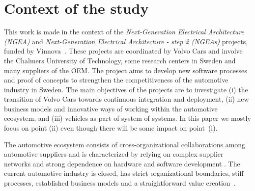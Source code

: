 \section{Context of the study}\label{sec:context}


This work is made in the context of the {\em Next-Generation Electrical Architecture (NGEA)} and {\em Next-Generation Electrical Architecture - step 2 (NGEAs)} projects, funded by Vinnova~\cite{Vinnova}. 
These projects are coordinated by Volvo Cars and involve the Chalmers University of Technology, some research centers in Sweden and many suppliers of the OEM. The project aims to develop new software processes and proof of concepts to strengthen the competitiveness of the automotive industry in Sweden. The main objectives of the projects are to investigate (i) the transition of Volvo Cars towards continuous integration and deployment, (ii) new business models and innovative ways of working within the automotive ecosystem, and (iii) vehicles as part of system of systems. 
In this paper we mostly focus on point (ii) even though there will be some impact on point~(i).

The automotive ecosystem consists of cross-organizational collaborations among automotive suppliers and is characterized by relying on complex supplier networks and strong dependence on hardware and software development \cite{Patrizio2016AAF_Chalmers,Knauss14d.:towards,Broy:2006:CAS:1134285.1134292}.
The current automotive industry is closed, has strict organizational boundaries, stiff processes, established business models and a straightforward value creation~\cite{ConnectedVehicle2012}.


